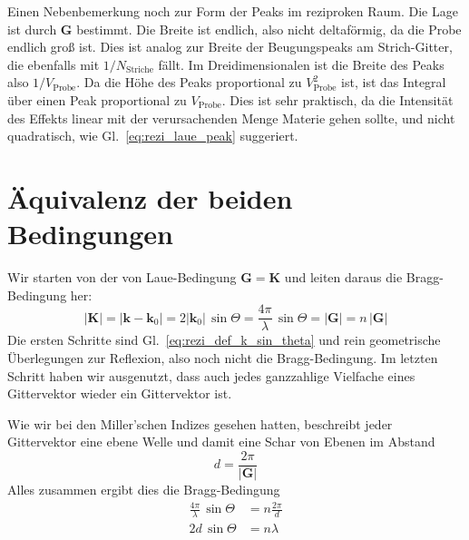 Einen Nebenbemerkung noch zur Form der Peaks im reziproken Raum. Die Lage ist durch $\mathbf{G}$ bestimmt. Die Breite ist endlich, also nicht deltaförmig, da die Probe endlich groß ist. Dies ist analog zur Breite der Beugungspeaks am Strich-Gitter, die ebenfalls mit $1/N_\text{Striche}$ fällt. Im Dreidimensionalen ist die Breite des Peaks also $1/V_\text{Probe}$. Da die Höhe des Peaks proportional zu $ V_\text{Probe}^2$ ist, ist das Integral über einen Peak proportional zu $ V_\text{Probe}$. Dies ist sehr praktisch, da die Intensität des Effekts linear mit der verursachenden Menge Materie gehen sollte, und nicht quadratisch, wie Gl.~\ref{eq:rezi_laue_peak} suggeriert.


\section{Äquivalenz der beiden Bedingungen}

Wir starten von der von Laue-Bedingung $\mathbf{G} =  \mathbf{K}$ und leiten daraus die Bragg-Bedingung her:
\begin{equation}
 | \mathbf{K} | =  |\mathbf{k} - \mathbf{k}_0| = 2 | \mathbf{k}_0| \, \sin \Theta = \frac{4 \pi}{ \lambda} \, \sin \Theta = | \mathbf{G} | = n \, | \mathbf{G} | 
\end{equation}
Die ersten Schritte sind Gl.~\ref{eq:rezi_def_k_sin_theta} und rein geometrische Überlegungen zur Reflexion, also noch nicht die Bragg-Bedingung. Im letzten Schritt haben wir ausgenutzt, dass auch jedes ganzzahlige Vielfache eines Gittervektor wieder ein Gittervektor ist.

Wie wir bei den Miller'schen Indizes gesehen hatten, beschreibt jeder Gittervektor eine ebene Welle und damit eine Schar von Ebenen im Abstand 
\begin{equation}
 d = \frac{2 \pi}{|\mathbf{G} | }
\end{equation}
 Alles zusammen ergibt dies die Bragg-Bedingung
 \begin{align}
   \frac{4 \pi}{ \lambda} \, \sin \Theta  & = n \frac{2 \pi}{d } \\
   2 d  \, \sin \Theta  & = n \lambda 
 \end{align}
 

